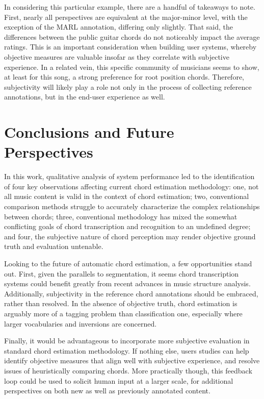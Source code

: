 \documentclass{article}
\begin{document}
In considering this particular example, there are a handful of takeaways to note.
First, nearly all perspectives are equivalent at the major-minor level, with the exception of the MARL annotation, differing only slightly.
That said, the differences between the public guitar chords do not noticeably impact the average ratings.
This is an important consideration when building user systems, whereby objective measures are valuable insofar as they correlate with subjective experience.
In a related vein, this specific community of musicians seems to show, at least for this song, a strong preference for root position chords.
Therefore, subjectivity will likely play a role not only in the process of collecting reference annotations, but in the end-user experience as well.



\section{Conclusions and Future Perspectives}
\label{sec:perspectives}

In this work, qualitative analysis of system performance led to the identification of four key observations affecting current chord estimation methodology:
one, not all music content is valid in the context of chord estimation;
two, conventional comparison methods struggle to accurately characterize the complex relationships between chords;
three, conventional methodology has mixed the somewhat conflicting goals of chord transcription and recognition to an undefined degree;
and four, the subjective nature of chord perception may render objective ground truth and evaluation untenable.

Looking to the future of automatic chord estimation, a few opportunities stand out.
First, given the parallels to segmentation, it seems chord transcription systems could benefit greatly from recent advances in music structure analysis.
Additionally, subjectivity in the reference chord annotations should be embraced, rather than resolved.
In the absence of objective truth, chord estimation is arguably more of a tagging problem than classification one, especially where larger vocabularies and inversions are concerned.

Finally, it would be advantageous to incorporate more subjective evaluation in standard chord estimation methodology.
If nothing else, users studies can help identify objective measures that align well with subjective experience, and resolve issues of heuristically comparing chords.
More practically though, this feedback loop could be used to solicit human input at a larger scale, for additional perspectives on both new as well as previously annotated content.






\end{document}
